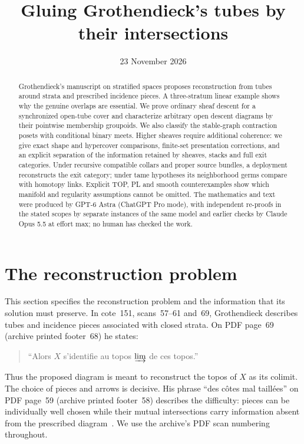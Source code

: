 \documentclass[11pt,a4paper]{article}
\title{Gluing Grothendieck's tubes by their intersections}
\author{}
\date{23 November 2026}
\theoremstyle{definition}
\begin{document}
\maketitle
\begin{abstract}
Grothendieck's manuscript on stratified spaces proposes reconstruction
from tubes around strata and prescribed incidence pieces. A three-stratum
linear example shows why the genuine overlaps are essential. We prove
ordinary sheaf descent for a synchronized open-tube cover and characterize
arbitrary open descent diagrams by their pointwise membership groupoids.
We also classify the stable-graph contraction posets with conditional
binary meets. Higher sheaves require additional coherence: we give exact
shape and hypercover comparisons, finite-set presentation corrections,
and an explicit separation of the information retained by sheaves,
stacks and full exit categories. Under recursive compatible collars and
proper source bundles, a deployment reconstructs the exit category;
under tame hypotheses its neighborhood germs compare with homotopy links.
Explicit TOP, PL and smooth counterexamples show which manifold and
regularity assumptions cannot be omitted. The mathematics and text were produced by GPT-6 Astra (ChatGPT Pro
mode), with independent re-proofs in the stated scopes by separate
instances of the same model and earlier checks by Claude Opus 5.5 at
effort max; no human has checked the work.
\end{abstract}

\setcounter{tocdepth}{1}
\begingroup\small\setlength{\parskip}{0pt}
\makeatletter{}\makeatother
\tableofcontents\endgroup
\newpage
\section{The reconstruction problem}
This section specifies the reconstruction problem and the information that its solution must preserve. In cote~151, scans~57--61 and~69, Grothendieck describes tubes and incidence pieces associated with closed strata. On PDF page~69 (archive printed footer~68) he states:
\begin{quote}
``Alors $X$ s'identifie au topos $\varinjlim$ de ces topos.''
\end{quote}
Thus the proposed diagram is meant to reconstruct the topos of $X$ as its colimit. The choice of pieces and arrows is decisive. His phrase ``des c\^otes mal taill\'ees'' on PDF page~59 (archive printed footer~58) describes the difficulty: pieces can be individually well chosen while their mutual intersections carry information absent from the prescribed diagram~\cite{Groth}. We use the archive's PDF scan numbering throughout.
\end{document}
